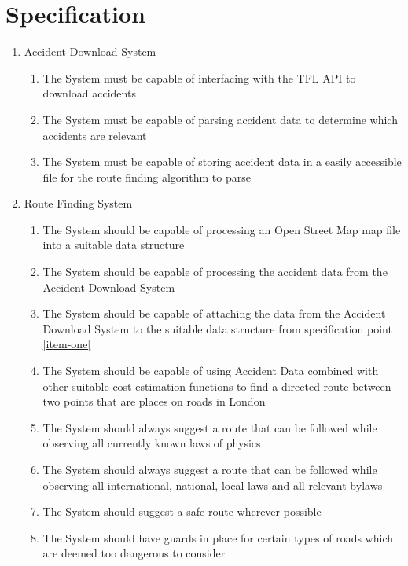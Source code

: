 \documentclass[11pt,twoside,a4paper]{report}
\begin{document}
\section{Specification}
\begin{enumerate}
\item Accident Download System
\begin{enumerate}[label=\arabic{enumi}.\arabic*]
    \item \label{downloadaccidents}The System must be capable of interfacing with the TFL API to download accidents
    \item \label{parseaccidents}The System must be capable of parsing accident data to determine which accidents are relevant
    \item \label{storeaccidents}The System must be capable of storing accident data in a easily accessible file for the route finding algorithm to parse
\end{enumerate} 
\item Route Finding System
\begin{enumerate}[label=\arabic{enumi}.\arabic*]
    \item \label{item-one} The System should be capable of processing an Open Street Map map file into a suitable data structure
    \item \label{item-two}The System should be capable of processing the accident data from the Accident Download System
    \item \label{item-three}The System should be capable of attaching the data from the Accident Download System to the suitable data structure from specification point \ref{item-one}
    \item \label{item-four}The System should be capable of using Accident Data combined with other suitable cost estimation functions to find a directed route between two points that are places on roads in London
    \item \label{item-five}The System should always suggest a route that can be followed while observing all currently known laws of physics
    \item \label{item-six}The System should always suggest a route that can be followed while observing all international, national, local laws and all relevant bylaws
    \item \label{item-seven}The System should suggest a safe route wherever possible
    \item \label{item-eight}The System should have guards in place for certain types of roads which are deemed too dangerous to consider

\end{enumerate}
\end{enumerate}
\end{document}

